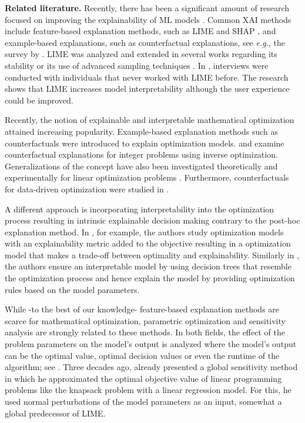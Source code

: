\documentclass{article}
\theoremstyle{plain}
\theoremstyle{definition}
\theoremstyle{remark}
\begin{document}
\textbf{Related literature.} Recently, there has been a significant amount of research focused on improving the explainability of ML models \citep{adadi_peeking_2018,bodria_benchmarking_2023,dwivedi_explainable_2023,linardatos_explainable_2021, minh_explainable_2022, das_opportunities_2020}. Common XAI methods include feature-based explanation methods, such as LIME \citep{ribeiro_why_2016} and SHAP \citep{lundberg_unified_2017}, and example-based explanations, such as counterfactual explanations, see \textit{e.g.}, the survey by \citet{guidotti_counterfactual_2024}. LIME was analyzed and extended in several works regarding its stability \cite{zhang_why_2019, zafar_deterministic_2021} or its use of advanced sampling techniques \cite{zhou_s-lime_2021, saito_improving_2021}. In \citep{dieber_why_2020}, interviews were conducted with individuals that never worked with LIME before. The research shows that LIME increases model interpretability although the user experience could be improved.

Recently, the notion of explainable and interpretable mathematical optimization attained increasing popularity. Example-based explanation methods such as counterfactuals were introduced to explain optimization models. \citet{korikov_counterfactual_2021} and \citet{korikov_objective-based_2023} examine counterfactual explanations for integer problems using inverse optimization. Generalizations of the concept have also been investigated theoretically and experimentally for linear optimization problems \citep{kurtz_counterfactual_2024}. Furthermore, counterfactuals for data-driven optimization were studied in \cite{forel_explainable_2023}.

A different approach is incorporating interpretability into the optimization process resulting in intrinsic explainable decision making contrary to the post-hoc explanation method. In \cite{aigner_framework_2024}, for example, the authors study optimization models with an explainability metric added to the objective resulting in a optimization model that makes a trade-off between optimality and explainability. Similarly in  \cite{goerigk_framework_2023}, the authors ensure an interpretable model by using decision trees that resemble the optimization process and hence explain the model by providing optimization rules based on the model parameters.

While -to the best of our knowledge- feature-based explanation methods are scarce for mathematical optimization, parametric optimization and sensitivity analysis are strongly related to these methods. In both fields, the effect of the problem parameters on the model's output is analyzed where the model's output can be the optimal value, optimal decision values or even the runtime of the algorithm; see \cite{still2018lectures,borgonovo_sensitivity_2016,iooss2015review,razavi_future_2021}. Three decades ago, \citet{wagner_global_1995} already presented a global sensitivity method in which he approximated the optimal objective value of linear programming problems like the knapsack problem with a linear regression model. For this, he used normal perturbations of the model parameters as an input, somewhat a global predecessor of LIME.
\end{document}

